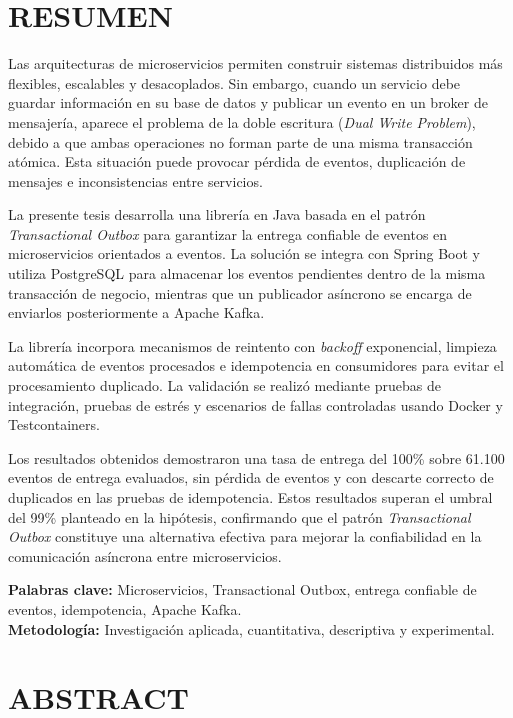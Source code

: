 \clearpage
\chapter*{\centering \normalsize RESUMEN}

Las arquitecturas de microservicios permiten construir sistemas distribuidos más flexibles, escalables y desacoplados. Sin embargo, cuando un servicio debe guardar información en su base de datos y publicar un evento en un broker de mensajería, aparece el problema de la doble escritura (\textit{Dual Write Problem}), debido a que ambas operaciones no forman parte de una misma transacción atómica. Esta situación puede provocar pérdida de eventos, duplicación de mensajes e inconsistencias entre servicios.

La presente tesis desarrolla una librería en Java basada en el patrón \textit{Transactional Outbox} para garantizar la entrega confiable de eventos en microservicios orientados a eventos. La solución se integra con Spring Boot y utiliza PostgreSQL para almacenar los eventos pendientes dentro de la misma transacción de negocio, mientras que un publicador asíncrono se encarga de enviarlos posteriormente a Apache Kafka.

La librería incorpora mecanismos de reintento con \textit{backoff} exponencial, limpieza automática de eventos procesados e idempotencia en consumidores para evitar el procesamiento duplicado. La validación se realizó mediante pruebas de integración, pruebas de estrés y escenarios de fallas controladas usando Docker y Testcontainers.

Los resultados obtenidos demostraron una tasa de entrega del 100\% sobre 61.100 eventos de entrega evaluados, sin pérdida de eventos y con descarte correcto de duplicados en las pruebas de idempotencia. Estos resultados superan el umbral del 99\% planteado en la hipótesis, confirmando que el patrón \textit{Transactional Outbox} constituye una alternativa efectiva para mejorar la confiabilidad en la comunicación asíncrona entre microservicios.

\textbf{Palabras clave:} Microservicios, Transactional Outbox, entrega confiable de eventos, idempotencia, Apache Kafka.\\
\textbf{Metodología:} Investigación aplicada, cuantitativa, descriptiva y experimental.

\clearpage
\chapter*{\centering \normalsize ABSTRACT}

